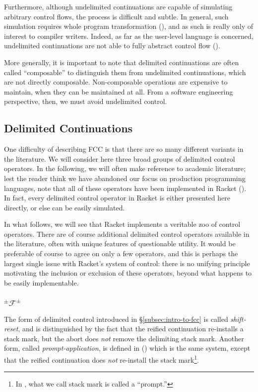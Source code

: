 \documentclass[11pt]{article}
\newcommand{\maybePage}{\newpage}
\newcommand\F{\mathcal{F}}
\newcommand\pmFpm{^\pm\F^\pm}
\begin{document}
Furthermore, although undelimited continuations are capable of simulating arbitrary control flows, the process is difficult and subtle.
In general, such simulation requires whole program transformation  (\cite{Filinski94}), and as such is really only of interest to compiler writers.
Indeed, as far as the user-level language is concerned, undelimited continuations are not able to fully abstract control flow  (\cite{Sitaram90}).

More generally, it is important to note that delimited continuations are often called ``composable'' to distinguish them from undelimited continuations, which are not directly composable.
Non-composable operations are expensive to maintain, when they can be maintained at all.
From a software engineering perspective, then, we must avoid undelimited control.


\maybePage
\subsection{Delimited Continuations}
\label{delimControl}

One difficulty of describing FCC is that there are so many different variants in the literature.
We will consider here three broad groups of delimited control operators.
In the following, we will often make reference to academic literature;
lest the reader think we have abandoned our focus on production programming languages, note that all of these operators have been implemented in Racket (\cite{RacketReference}).
In fact, every delimited control operator in Racket is either presented here directly, or else can be easily simulated.

In what follows, we will see that Racket implements a veritable zoo of control operators.
There are of course additional delimited control operators available in the literature, often with unique features of questionable utility.
It would be preferable of course to agree on only a few operators, and this is perhaps the largest single issue with Racket's system of control: there is no unifying principle motivating the inclusion or exclusion of these operators, beyond what happens to be easily implementable.

\maybePage
\subsubsection{$\pmFpm$}

The form of delimited control introduced in \S\ref{subsec:intro-to-fcc} is called \textit{shift-reset}, and is distinguished by the fact that the reified continuation re-installs a stack mark, but the abort does \emph{not} remove the delimiting stack mark.
Another form, called \emph{prompt-application}, is defined in (\cite{PromptApplication}) which is the same system, except that the reified continuation does \emph{not} re-install the stack mark\footnote{In \cite{PromptApplication}, what we call stack mark is called a ``prompt.''}.
\end{document}
